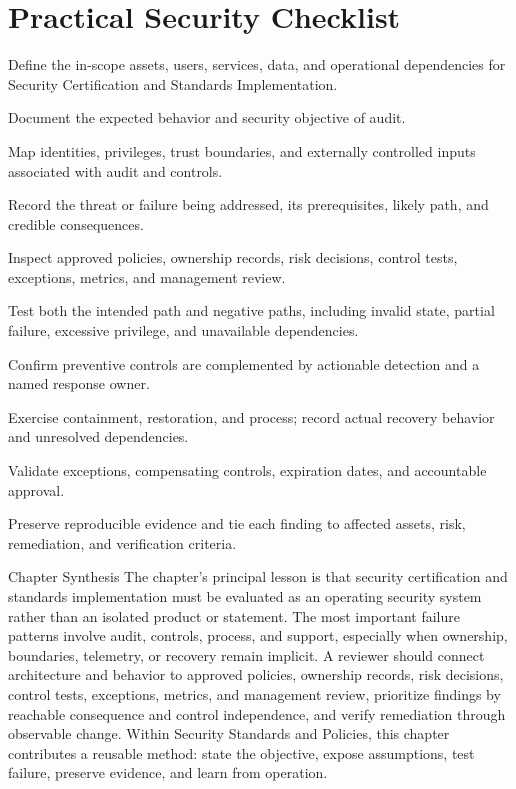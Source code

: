 \documentclass[11pt,letterpaper]{article}
\begin{document}
\section*{Practical Security Checklist}
\begin{CornellChecklist}
\item Define the in-scope assets, users, services, data, and operational dependencies for Security Certification and Standards Implementation.
\item Document the expected behavior and security objective of audit.
\item Map identities, privileges, trust boundaries, and externally controlled inputs associated with audit and controls.
\item Record the threat or failure being addressed, its prerequisites, likely path, and credible consequences.
\item Inspect approved policies, ownership records, risk decisions, control tests, exceptions, metrics, and management review.
\item Test both the intended path and negative paths, including invalid state, partial failure, excessive privilege, and unavailable dependencies.
\item Confirm preventive controls are complemented by actionable detection and a named response owner.
\item Exercise containment, restoration, and process; record actual recovery behavior and unresolved dependencies.
\item Validate exceptions, compensating controls, expiration dates, and accountable approval.
\item Preserve reproducible evidence and tie each finding to affected assets, risk, remediation, and verification criteria.
\end{CornellChecklist}
\begin{CornellSummaryBox}{Chapter Synthesis}
The chapter's principal lesson is that security certification and standards implementation must be evaluated as an operating security system rather than an isolated product or statement. The most important failure patterns involve audit, controls, process, and support, especially when ownership, boundaries, telemetry, or recovery remain implicit. A reviewer should connect architecture and behavior to approved policies, ownership records, risk decisions, control tests, exceptions, metrics, and management review, prioritize findings by reachable consequence and control independence, and verify remediation through observable change. Within Security Standards and Policies, this chapter contributes a reusable method: state the objective, expose assumptions, test failure, preserve evidence, and learn from operation.
\end{CornellSummaryBox}
\end{document}
